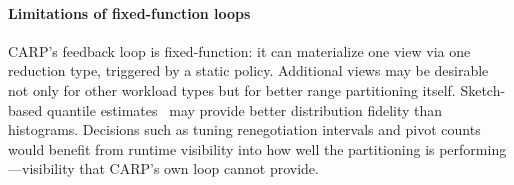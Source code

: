 \paragraph{Limitations of fixed-function loops} CARP’s feedback loop is fixed-function: it can
materialize one view via one reduction type, triggered by a static policy.
Additional views
may be desirable not only for other workload types but for better range partitioning itself.
Sketch-based quantile estimates~\cite{Karni2016:KLLSketch} may provide better distribution fidelity
than histograms.
Decisions such as tuning renegotiation intervals and pivot counts would
benefit from runtime visibility into how well the partitioning is performing---visibility that
CARP’s own loop cannot provide.



